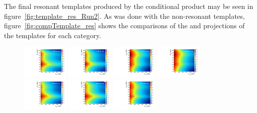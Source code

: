 The final resonant templates produced by the conditional product may be seen in figure~\ref{fig:template_res_Run2}.
As was done with the non-resonant templates, figure~\ref{fig:compTemplate_res} shows the comparisons of the \MVV and \MJ projections of the templates for each category.

\begin{figure}[htbp]
  \centering
  \includegraphics[width=0.2\textwidth]{fig/analysisAppendix/template_res_mu_HP_bb_LDy.pdf}
  \includegraphics[width=0.2\textwidth]{fig/analysisAppendix/template_res_e_HP_bb_LDy.pdf}
  \includegraphics[width=0.2\textwidth]{fig/analysisAppendix/template_res_mu_LP_bb_LDy.pdf}
  \includegraphics[width=0.2\textwidth]{fig/analysisAppendix/template_res_e_LP_bb_LDy.pdf}\\
  \includegraphics[width=0.2\textwidth]{fig/analysisAppendix/template_res_mu_HP_nobb_LDy.pdf}
  \includegraphics[width=0.2\textwidth]{fig/analysisAppendix/template_res_e_HP_nobb_LDy.pdf}
  \includegraphics[width=0.2\textwidth]{fig/analysisAppendix/template_res_mu_LP_nobb_LDy.pdf}

\end{figure}
